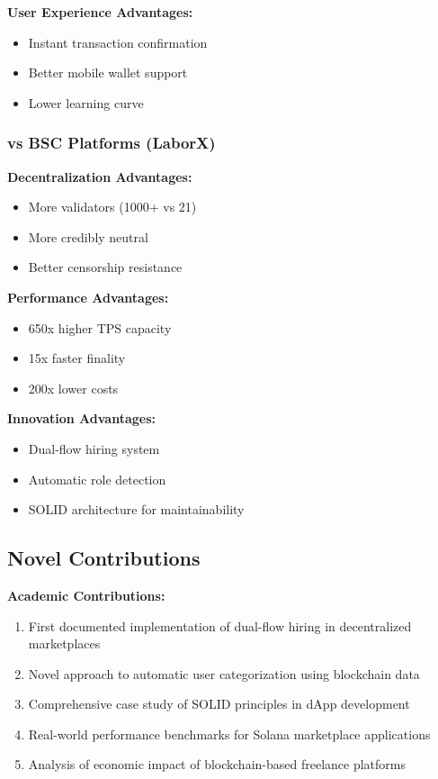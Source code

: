 \documentclass[a4paper,13pt,twoside]{report}
\theoremstyle{definition}
\begin{document}
\textbf{User Experience Advantages:}
\begin{itemize}
    \item Instant transaction confirmation
    \item Better mobile wallet support
    \item Lower learning curve
\end{itemize}

\subsubsection{vs BSC Platforms (LaborX)}

\textbf{Decentralization Advantages:}
\begin{itemize}
    \item More validators (1000+ vs 21)
    \item More credibly neutral
    \item Better censorship resistance
\end{itemize}

\textbf{Performance Advantages:}
\begin{itemize}
    \item 650x higher TPS capacity
    \item 15x faster finality
    \item 200x lower costs
\end{itemize}

\textbf{Innovation Advantages:}
\begin{itemize}
    \item Dual-flow hiring system
    \item Automatic role detection
    \item SOLID architecture for maintainability
\end{itemize}

\subsection{Novel Contributions}

\textbf{Academic Contributions:}
\begin{enumerate}
    \item First documented implementation of dual-flow hiring in decentralized marketplaces
    \item Novel approach to automatic user categorization using blockchain data
    \item Comprehensive case study of SOLID principles in dApp development
    \item Real-world performance benchmarks for Solana marketplace applications
    \item Analysis of economic impact of blockchain-based freelance platforms
\end{enumerate}
\end{document}
